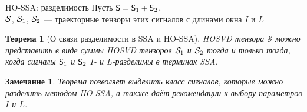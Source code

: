 \documentclass[pdf, unicode, 9pt, notheorems, handout]{beamer}
\newtheorem{theorem}{Теорема}
\newtheorem{remark}{Замечание}
\begin{document}
    \begin{frame}{HO-SSA: разделимость}
        Пусть $\mathsf{S} = \mathsf{S}_1 + \mathsf{S}_2$,\\ 
        $\mathcal{S}$, $\mathcal{S}_1$, $\mathcal{S}_2$ --- траекторные тензоры этих сигналов с длинами окна $I$ и $L$
        \begin{theorem}[О связи разделимости в SSA и HO-SSA]
            \textup{HOSVD} тензора $\mathcal{S}$ можно представить в виде суммы \textup{HOSVD}
            тензоров $\mathcal{S}_1$ и $\mathcal{S}_2$ тогда и только тогда, когда сигналы 
            $\mathsf{S}_1$ и $\mathsf{S}_2$ $I$- и $L$-разделимы в терминах \textup{SSA}.
        \end{theorem}
        \vspace{0.4cm}
        \begin{remark}
            Теорема позволяет выделить класс сигналов, которые можно разделить методом \textup{HO-SSA},
            а также даёт рекомендации к выбору параметров $I$ и $L$.
        \end{remark}
    \end{frame}
    
    
\end{document}
